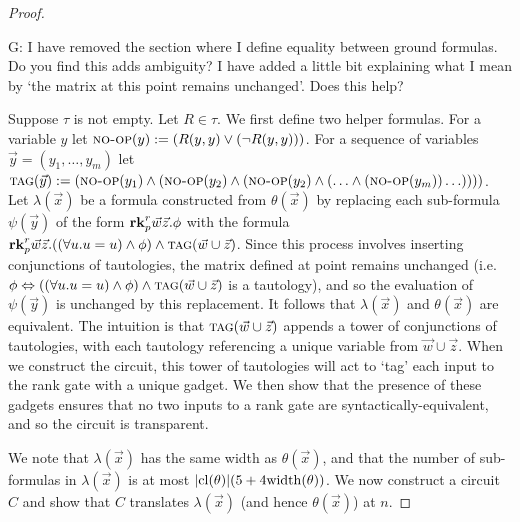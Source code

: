\documentclass[../paper.tex]{subfiles}
\begin{document}
\begin{proof}
  \begin{remark}
    G: I have removed the section where I define equality between ground
    formulas. Do you find this adds ambiguity? I have added a little bit
    explaining what I mean by `the matrix at this point remains unchanged'. Does
    this help?
  \end{remark}
  
  Suppose $\tau$ is not empty. Let $R \in \tau$. We first define two helper
  formulas. For a variable $y$ let ${\normalfont\textsc{no-op}}(y) := (R(y, y) \lor (\neg R(y,
  y)))$. For a sequence of variables $\vec{y} = (y_1, \ldots, y_m)$ let
  ${\normalfont\textsc{tag}} (\vec{y}) := ({\normalfont\textsc{no-op}}(y_1) \land ({\normalfont\textsc{no-op}}(y_2) \land (
  {\normalfont\textsc{no-op}}(y_2) \land ( \ldots \land ({\normalfont\textsc{no-op}}(y_m)) \ldots))))$. Let
  $\lambda (\vec{x})$ be a formula constructed from $\theta(\vec{x})$ by
  replacing each sub-formula $\psi(\vec{y})$ of the form $\text{\textbf{rk}}^r_p \vec{w}
  \vec{z} . \phi$ with the formula $\text{\textbf{rk}}^r_p \vec{w}\vec{z} . ((\forall u . u =
  u) \land \phi) \land {\normalfont\textsc{tag}}(\vec{w} \cup \vec{z})$. Since this process
  involves inserting conjunctions of tautologies, the matrix defined at point
  remains unchanged (i.e. $\phi \Leftrightarrow ((\forall u . u = u) \land \phi)
  \land {\normalfont\textsc{tag}}(\vec{w} \cup \vec{z})$ is a tautology), and so the evaluation
  of $\psi(\vec{y})$ is unchanged by this replacement. It follows that $\lambda
  (\vec{x})$ and $\theta (\vec{x})$ are equivalent. The intuition is that
  ${\normalfont\textsc{tag}}(\vec{w} \cup \vec{z})$ appends a tower of conjunctions of
  tautologies, with each tautology referencing a unique variable from $\vec{w}
  \cup \vec{z}$. When we construct the circuit, this tower of tautologies will
  act to `tag' each input to the rank gate with a unique gadget. We then show
  that the presence of these gadgets ensures that no two inputs to a rank gate
  are syntactically-equivalent, and so the circuit is
  transparent.
  



  We note that $\lambda(\vec{x})$ has the same width as $\theta(\vec{x})$, and
  that the number of sub-formulas in $\lambda(\vec{x})$ is at most $\vert
  \mathrm{cl}(\theta) \vert (5 + 4\mathrm{width}(\theta))$. We now construct a circuit $C$ and
  show that $C$ translates $\lambda(\vec{x})$ (and hence $\theta(\vec{x})$) at
  $n$.


\end{proof}
\end{document}
